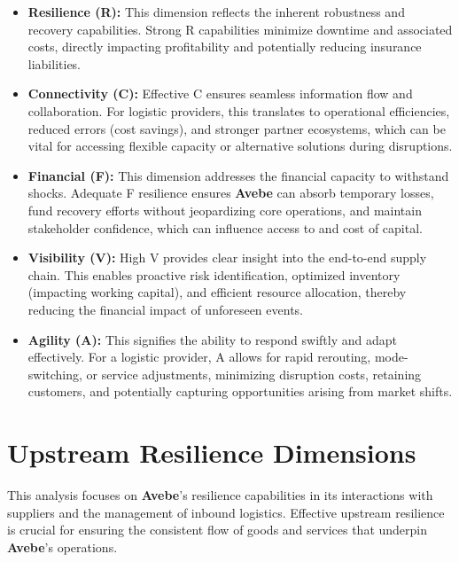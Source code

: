 \documentclass[
  oneside,
  open=any,
  fontsize=11pt]{scrbook}
\providecommand{\tightlist}{%
  \setlength{\itemsep}{0pt}\setlength{\parskip}{0pt}}
\begin{document}
\begin{itemize}
\tightlist
\item
  \textbf{Resilience (R):} This dimension reflects the inherent
  robustness and recovery capabilities. Strong R capabilities minimize
  downtime and associated costs, directly impacting profitability and
  potentially reducing insurance liabilities.
\item
  \textbf{Connectivity (C):} Effective C ensures seamless information
  flow and collaboration. For logistic providers, this translates to
  operational efficiencies, reduced errors (cost savings), and stronger
  partner ecosystems, which can be vital for accessing flexible capacity
  or alternative solutions during disruptions.
\item
  \textbf{Financial (F):} This dimension addresses the financial
  capacity to withstand shocks. Adequate F resilience ensures
  \textbf{Avebe} can absorb temporary losses, fund recovery efforts
  without jeopardizing core operations, and maintain stakeholder
  confidence, which can influence access to and cost of capital.
\item
  \textbf{Visibility (V):} High V provides clear insight into the
  end-to-end supply chain. This enables proactive risk identification,
  optimized inventory (impacting working capital), and efficient
  resource allocation, thereby reducing the financial impact of
  unforeseen events.
\item
  \textbf{Agility (A):} This signifies the ability to respond swiftly
  and adapt effectively. For a logistic provider, A allows for rapid
  rerouting, mode-switching, or service adjustments, minimizing
  disruption costs, retaining customers, and potentially capturing
  opportunities arising from market shifts.
\end{itemize}

\section{Upstream Resilience
Dimensions}\label{upstream-resilience-dimensions}

This analysis focuses on \textbf{Avebe}'s resilience capabilities in its
interactions with suppliers and the management of inbound logistics.
Effective upstream resilience is crucial for ensuring the consistent
flow of goods and services that underpin \textbf{Avebe}'s operations.
\end{document}
